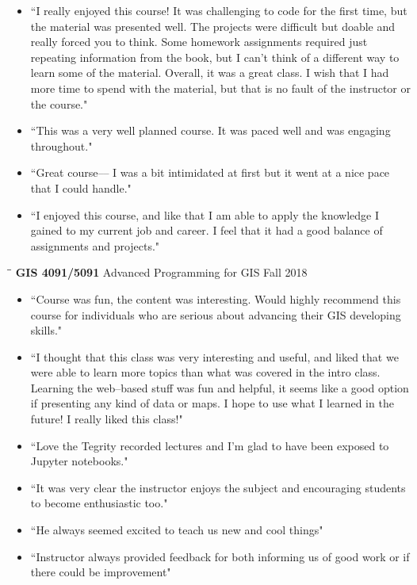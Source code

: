 \documentclass{res}
\begin{document}
\begin{resume}
\begin{itemize}
\item``I really enjoyed this course! It was challenging to code for the first time, but the material was presented well. The projects were difficult but doable and really forced you to think. Some homework assignments required just repeating information from the book, but I can't think of a different way to learn some of the material. Overall, it was a great class. I wish that I had more time to spend with the material, but that is no fault of the instructor or the course."
\item``This was a very well planned course. It was paced well and was engaging throughout."
\item``Great course–– I was a bit intimidated at first but it went at a nice pace that I could handle."
\item``I enjoyed this course, and like that I am able to apply the knowledge I gained to my current job and career. I feel that it had a good balance of assignments and projects."
\end{itemize}
\begin{tabbing}
	\hspace{2.3in}\= \hspace{2.6in}\= \kill %
	{\bf GIS 4091/5091} \>Advanced Programming for GIS     \>Fall 2018\\
	\>
\end{tabbing}\vspace{-20pt}      %
\begin{itemize}  
\item ``Course was fun, the content was interesting. Would highly recommend this course for individuals who are serious about advancing their GIS developing skills."
\item ``I thought that this class was very interesting and useful, and liked that we were able to learn more topics than what was covered in the intro class. Learning the web–based stuff was fun and helpful, it seems like a good option if presenting any kind of data or maps. I hope to use what I learned in the future! I really liked this class!"
\item ``Love the Tegrity recorded lectures and I'm glad to have been exposed to Jupyter notebooks."
\item ``It was very clear the instructor enjoys the subject and encouraging students to become enthusiastic too."
\item ``He always seemed excited to teach us new and cool things"
\item ``Instructor always provided feedback for both informing us of good work or if there could be improvement"

\end{itemize}
\end{resume}
\end{document}
